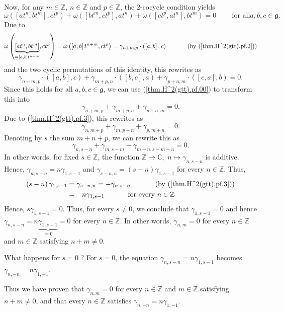 \documentclass[etingof-lie.tex]{subfiles}
\begin{document}
Now, for any $m\in\mathbb{Z}$, $n\in\mathbb{Z}$ and $p\in\mathbb{Z}$, the
$2$-cocycle condition yields%
\[
\omega\left(  \left[  at^{n},bt^{m}\right]  ,ct^{p}\right)  +\omega\left(
\left[  bt^{m},ct^{p}\right]  ,at^{n}\right)  +\omega\left(  \left[
ct^{p},at^{n}\right]  ,bt^{m}\right)  =0\ \ \ \ \ \ \ \ \ \ \text{for all
}a,b,c\in\mathfrak{g}.
\]
Due to%
\[
\omega\left(  \underbrace{\left[  at^{n},bt^{m}\right]  }_{=\left[
a,b\right]  t^{n+m}},ct^{p}\right)  =\omega\left(  \left[  a,b\right]
t^{n+m},ct^{p}\right)  =\gamma_{n+m,p}\cdot\left(  \left[  a,b\right]
,c\right)  \ \ \ \ \ \ \ \ \ \ \left(  \text{by (\ref{thm.H^2(gtt).pf.2}%
)}\right)
\]
and the two cyclic permutations of this identity, this rewrites as%
\[
\gamma_{n+m,p}\cdot\left(  \left[  a,b\right]  ,c\right)  +\gamma_{m+p,n}%
\cdot\left(  \left[  b,c\right]  ,a\right)  +\gamma_{p+n,m}\cdot\left(
\left[  c,a\right]  ,b\right)  =0.
\]
Since this holds for all $a,b,c\in\mathfrak{g}$, we can use
(\ref{thm.H^2(gtt).pf.00}) to transform this into%
\[
\gamma_{n+m,p}+\gamma_{m+p,n}+\gamma_{p+n,m}=0.
\]
Due to (\ref{thm.H^2(gtt).pf.3}), this rewrites as%
\[
\gamma_{n,m+p}+\gamma_{m,p+n}+\gamma_{p,m+n}=0.
\]
Denoting by $s$ the sum $m+n+p$, we can rewrite this as%
\[
\gamma_{n,s-n}+\gamma_{m,s-m}-\gamma_{m+n,s-m-n}=0.
\]
In other words, for fixed $s\in\mathbb{Z}$, the function $\mathbb{Z}%
\rightarrow\mathbb{C},$ $n\mapsto\gamma_{n,s-n}$ is additive. Hence,
$\gamma_{n,s-n}=n\gamma_{1,s-1}$ and $\gamma_{s-n,n}=\left(  s-n\right)
\gamma_{1,s-1}$ for every $n\in\mathbb{Z}$. Thus,
\begin{align*}
\left(  s-n\right)  \gamma_{1,s-1}  &  =\gamma_{s-n,n}=-\gamma_{n,s-n}%
\ \ \ \ \ \ \ \ \ \ \left(  \text{by (\ref{thm.H^2(gtt).pf.3})}\right) \\
&  =-n\gamma_{1,s-1}\ \ \ \ \ \ \ \ \ \ \text{for every }n\in\mathbb{Z}%
\end{align*}
Hence, $s\gamma_{1,s-1}=0$. Thus, for every $s\neq0$, we conclude that
$\gamma_{1,s-1}=0$ and hence $\gamma_{n,s-n}=n\underbrace{\gamma_{1,s-1}}%
_{=0}=0$ for every $n\in\mathbb{Z}$. In other words, $\gamma_{n,m}=0$ for
every $n\in\mathbb{Z}$ and $m\in\mathbb{Z}$ satisfying $n+m\neq0$.

What happens for $s=0$ ? For $s=0$, the equation $\gamma_{n,s-n}%
=n\gamma_{1,s-1}$ becomes $\gamma_{n,-n}=n\gamma_{1,-1}$.

Thus we have proven that $\gamma_{n,m}=0$ for every $n\in\mathbb{Z}$ and
$m\in\mathbb{Z}$ satisfying $n+m\neq0$, and that every $n\in\mathbb{Z}$
satisfies $\gamma_{n,-n}=n\gamma_{1,-1}$.
\end{document}
